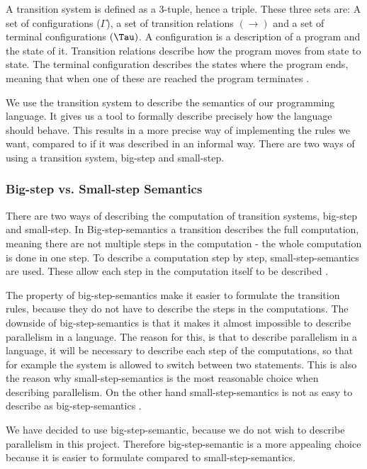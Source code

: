 A transition system is defined as a 3-tuple, hence a triple. These three sets are: A set of configurations ($\Gamma$), a set of transition relations $(\rightarrow)$ and a set of terminal configurations $(\Tau)$.
A configuration is a description of a program and the state of it. Transition relations describe how the program moves from state to state. The terminal configuration describes the states where the program ends, meaning that when one of these are reached the program terminates \citep{HHTree}.

We use the transition system to describe the semantics of our programming language. It gives us a tool to formally describe precisely how the language should behave. This results in a more precise way of implementing the rules we want, compared to if it was described in an informal way. There are two ways of using a transition system, big-step and small-step.

\subsubsection{Big-step vs. Small-step Semantics}
\label{sec:BvsS}
There are two ways of describing the computation of transition systems, big-step and small-step. In Big-step-semantics a transition describes the full computation, meaning there are not multiple steps in the computation - the whole computation is done in one step. To describe a computation step by step, small-step-semantics are used. These allow each step in the computation itself to be described \citep{HHTree}.

The property of big-step-semantics make it easier to formulate the transition rules, because they do not have to describe the steps in the computations. The downside of big-step-semantics is that it makes it almost impossible to describe parallelism in a language. The reason for this, is that to describe parallelism in a language, it will be necessary to describe each step of the computations, so that for example the system is allowed to switch between two statements. This is also the reason why small-step-semantics is the most reasonable choice when describing parallelism. On the other hand small-step-semantics is not as easy to describe as big-step-semantics \citep{HHTree}.

We have decided to use big-step-semantic, because we do not wish to describe parallelism in this project. Therefore big-step-semantic is a more appealing choice because it is easier to formulate compared to small-step-semantics.

